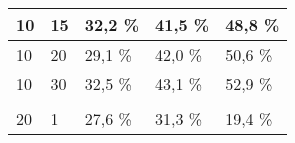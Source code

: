 \begin{table}[!htb]
\begin{tabular}{lllll}
\multicolumn{1}{|l|}{10}                                                     & \multicolumn{1}{l|}{15}                                                                & \multicolumn{1}{l|}{32,2 \%}                                                                                           & \multicolumn{1}{l|}{41,5 \%}                                                                                            & \multicolumn{1}{l|}{48,8 \%}                                                                                            \\ \hline
\multicolumn{1}{|l|}{10}                                                     & \multicolumn{1}{l|}{20}                                                                & \multicolumn{1}{l|}{29,1 \%}                                                                                           & \multicolumn{1}{l|}{42,0 \%}                                                                                            & \multicolumn{1}{l|}{50,6 \%}                                                                                            \\ \hline
\multicolumn{1}{|l|}{10}                                                     & \multicolumn{1}{l|}{30}                                                                & \multicolumn{1}{l|}{32,5 \%}                                                                                           & \multicolumn{1}{l|}{43,1 \%}                                                                                            & \multicolumn{1}{l|}{52,9 \%}                                                                                            \\ \hline
                                                                             &                                                                                        &                                                                                                                       &                                                                                                                        &                                                                                                                        \\ \hline
\multicolumn{1}{|l|}{20}                                                     & \multicolumn{1}{l|}{1}                                                                 & \multicolumn{1}{l|}{27,6 \%}                                                                                           & \multicolumn{1}{l|}{31,3 \%}                                                                                            & \multicolumn{1}{l|}{19,4 \%}                                                                                            \\ \hline

\end{tabular}
\end{table}
